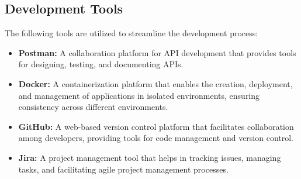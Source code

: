 \subsection{Development Tools}
The following tools are utilized to streamline the development process:
\begin{itemize}
    \item \textbf{Postman:} A collaboration platform for API development that provides tools for designing, testing, and documenting APIs.
    \item \textbf{Docker:} A containerization platform that enables the creation, deployment, and management of applications in isolated environments, ensuring consistency across different environments.
    \item \textbf{GitHub:} A web-based version control platform that facilitates collaboration among developers, providing tools for code management and version control.
    \item \textbf{Jira:} A project management tool that helps in tracking issues, managing tasks, and facilitating agile project management processes.
\end{itemize}

